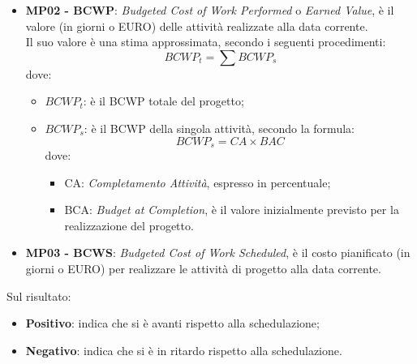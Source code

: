 		\begin{itemize}
			\item {\bfseries MP02 - BCWP}: {\itshape Budgeted Cost of Work Performed} o {\itshape
			Earned Value}, è  il valore (in giorni o EURO) delle attività realizzate alla data corrente.\\
			Il suo valore è una stima approssimata, secondo i seguenti procedimenti:
			\begin{displaymath}
				BCWP_t = \sum BCWP_s
			\end{displaymath}
			dove:
			\begin{itemize}
				\item {\bfseries $BCWP_t$}: è il BCWP totale del progetto;
				\item {\bfseries $BCWP_s$}: è il BCWP della singola attività, secondo la formula:
				\begin{displaymath}
					BCWP_s = CA\times BAC
				\end{displaymath}
			dove:
			\begin{itemize}
				\item  CA: {\itshape Completamento Attività}, espresso in percentuale;
				\item BCA: {\itshape Budget at Completion}, è il valore inizialmente previsto per la realizzazione del progetto.
			\end{itemize}
			\end{itemize}
			\item {\bfseries MP03 - BCWS}: {\itshape Budgeted Cost of Work Scheduled}, è il costo pianificato (in giorni o EURO) per realizzare le attività di progetto alla data corrente. \\
		\end{itemize}

		Sul risultato:
		\begin{itemize}
		\item {\bfseries Positivo}: indica che si è avanti rispetto alla schedulazione;
		\item {\bfseries Negativo}: indica che si è in ritardo rispetto alla schedulazione.\\
		\end{itemize}
